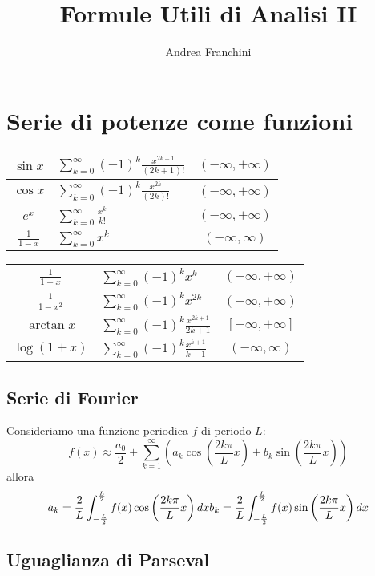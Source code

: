 \documentclass[10pt,a4paper,fleqn]{article}
\author{Andrea Franchini}
\title{Formule Utili di Analisi II}
\begin{document}
    \section*{Serie di potenze come funzioni}
    \renewcommand{\arraystretch}{2}
    \begin{tabular}{|c|l|c|}
        \hline
        $\sin x$
        &$\sum^{\infty}_{k=0}(-1)^k\frac{x^{2k+1}}{(2k+1)!}$
        &$(-\infty, +\infty)$\\
        \hline
        $\cos x$
        &$\sum^{\infty}_{k=0}(-1)^k\frac{x^{2k}}{(2k)!}$
        &$(-\infty, +\infty)$\\
        \hline
        $e^x$
        &$\sum^{\infty}_{k=0}\frac{x^k}{k!}$
        &$(-\infty, +\infty)$\\
        \hline
        $\frac{1}{1-x}$
        &$\sum^{\infty}_{k=0}x^k$
        &$(-\infty, \infty)$\\
        \hline
    \end{tabular}
    \begin{tabular}{|c|l|c|}
        \hline
        $\frac{1}{1+x}$
        &$\sum^{\infty}_{k=0} (-1)^k x^k$
        &$(-\infty, +\infty)$\\
        \hline
        $\frac{1}{1-x^2}$
        &$\sum^{\infty}_{k=0} (-1)^k x^{2k}$
        &$(-\infty, +\infty)$\\
        \hline
        $\arctan x$
        &$\sum^{\infty}_{k=0} (-1)^k\frac{x^{2k+1}}{2k+1}$
        &$[-\infty, +\infty]$\\
        \hline
        $\log (1+x)$
        &$\sum^{\infty}_{k=0}(-1)^k \frac{x^{k+1}}{k+1}$
        &$(-\infty, \infty)$\\
        \hline
    \end{tabular}

    \subsection*{Serie di Fourier}

    Consideriamo una funzione periodica $f$ di periodo $L$:
    \[
    f(x) \approx \frac{a_0}{2} + \sum_{k=1}^{\infty}\left(a_k \cos \left(\frac{2k\pi}{L}x\right) + b_k \sin\left(\frac{2k\pi}{L}x\right)\right)
    \]
    allora
    \[
    a_k = \frac{2}{L}\int^{\frac{L}{2}}_{-\frac{L}{2}}f(x)\cos\left(\frac{2k\pi}{L}x\right)dx\\
    b_k = \frac{2}{L}\int^{\frac{L}{2}}_{-\frac{L}{2}}f(x)\sin\left(\frac{2k\pi}{L}x\right)dx
    \]

    \subsection*{Uguaglianza di Parseval}
\end{document}
